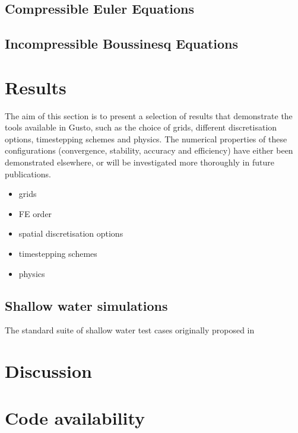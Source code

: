 \documentclass[11pt, a4paper]{article}
\begin{document}
\subsection{Compressible Euler Equations}

\subsection{Incompressible Boussinesq Equations}



\section{Results}
The aim of this section is to present a selection of results that
demonstrate the tools available in Gusto, such as the choice of grids,
different discretisation options, timestepping schemes and
physics. The numerical properties of these configurations
(convergence, stability, accuracy and efficiency) have either been
demonstrated elsewhere, or will be investigated more thoroughly in
future publications.

\begin{itemize}
\item grids
\item FE order
\item spatial discretisation options
\item timestepping schemes
\item physics
\end{itemize}

\subsection{Shallow water simulations}
The standard suite of shallow water test cases originally proposed in
\citet{williamson1992standard}



\section{Discussion}

\section{Code availability}


\end{document}
